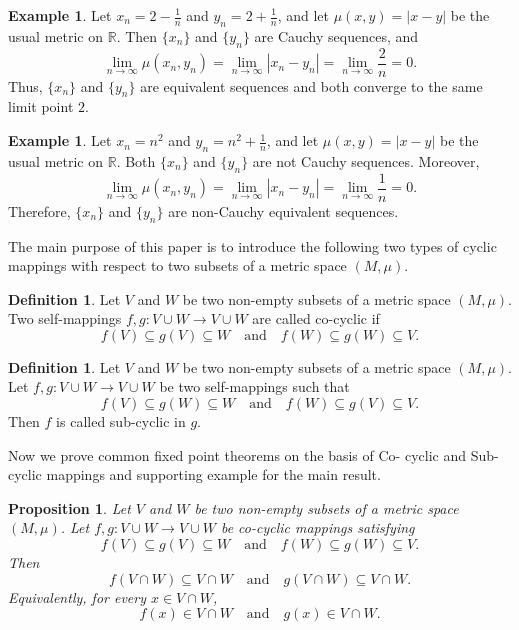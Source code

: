 \documentclass[11pt,a4paper,margin=1in]{amsart}
\theoremstyle{plain}
\newtheorem{proposition}[theorem]{Proposition}
\theoremstyle{definition}
\newtheorem{definition}[theorem]{Definition}
\newtheorem{example}[theorem]{Example}
\theoremstyle{remark}
\begin{document}
\begin{example}\label{exmp:equivalent-cauchy}
Let $x_n=2-\frac{1}{n}$ and $y_n=2+\frac{1}{n}$, and let $\mu(x,y)=|x-y|$ be the usual metric on $\mathbb{R}$. Then
$\{x_n\}$ and $\{y_n\}$ are Cauchy sequences, and
\[
\lim_{n\to\infty}\mu(x_n,y_n)
=
\lim_{n\to\infty}|x_n-y_n|
=
\lim_{n\to\infty}\frac{2}{n}
=0.
\]
Thus, $\{x_n\}$ and $\{y_n\}$ are equivalent sequences and both converge
to the same limit point $2$.
\end{example}

\begin{example}\label{exmp:non-cauchy-equivalent} 
Let $x_n=n^2$ and $y_n=n^2+\frac{1}{n}$, and let $\mu(x,y)=|x-y|$ be the usual metric on $\mathbb{R}$. Both
$\{x_n\}$ and $\{y_n\}$ are not Cauchy sequences. Moreover,
\[
\lim_{n\to\infty}\mu(x_n,y_n)
=
\lim_{n\to\infty}|x_n-y_n|
=
\lim_{n\to\infty}\frac{1}{n}
=0.
\]
Therefore, $\{x_n\}$ and $\{y_n\}$ are non-Cauchy equivalent sequences.
\end{example}

The main purpose of this paper is to introduce the following two types of cyclic mappings with respect to two subsets of a metric space $(M,\mu)$.

\begin{definition}\label{def:co-cyclic-mapping}
Let $V$ and $W$ be two non-empty subsets of a metric space $(M,\mu)$.
Two self-mappings $f,g:V\cup W\to V\cup W$ are called co-cyclic if
\[
f(V)\subseteq g(V)\subseteq W
\quad\text{and}\quad
f(W)\subseteq g(W)\subseteq V.
\]
\end{definition}

\begin{definition}\label{def:sub-cyclic-mapping}
Let $V$ and $W$ be two non-empty subsets of a metric space $(M,\mu)$.
Let $f,g:V\cup W\to V\cup W$ be two self-mappings such that
\[
f(V)\subseteq g(W)\subseteq W
\quad\text{and}\quad
f(W)\subseteq g(V)\subseteq V.
\]
Then $f$ is called sub-cyclic in $g$.
\end{definition}

Now we prove common fixed point theorems on the basis of Co- cyclic and Sub-cyclic mappings and supporting example for the main result.

\begin{proposition}\label{pro:intersection-invariance}
Let $V$ and $W$ be two non-empty subsets of a metric space $(M,\mu)$.
Let $f,g:V\cup W\to V\cup W$ be co-cyclic mappings satisfying
\[
f(V)\subseteq g(V)\subseteq W
\quad\text{and}\quad
f(W)\subseteq g(W)\subseteq V.
\]
Then
\[
f(V\cap W)\subseteq V\cap W
\quad\text{and}\quad
g(V\cap W)\subseteq V\cap W.
\]
Equivalently, for every $x\in V\cap W$,
\[
f(x)\in V\cap W
\quad\text{and}\quad
g(x)\in V\cap W.
\]
\end{proposition}
\end{document}
